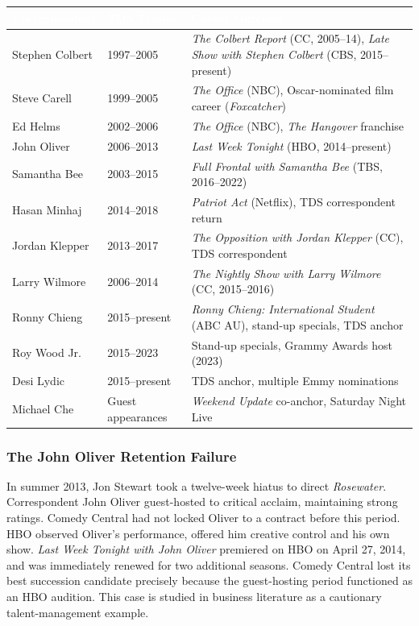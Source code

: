 \documentclass[11pt,letterpaper]{article}
\newcommand{\tableheader}[1]{\textbf{\sffamily\textcolor{white}{#1}}}
\begin{document}
\begin{center}
\begin{tabularx}{\textwidth}{L{3.5cm}L{3cm}X}
\toprule
{}
\tableheader{Correspondent} & \tableheader{TDS Tenure} & \tableheader{Career Outcome} \\
\midrule
Stephen Colbert & 1997--2005 & \textit{The Colbert Report} (CC, 2005--14), \textit{Late Show with Stephen Colbert} (CBS, 2015--present) \\
Steve Carell & 1999--2005 & \textit{The Office} (NBC), Oscar-nominated film career (\textit{Foxcatcher}) \\
Ed Helms & 2002--2006 & \textit{The Office} (NBC), \textit{The Hangover} franchise \\
John Oliver & 2006--2013 & \textit{Last Week Tonight} (HBO, 2014--present) \\
Samantha Bee & 2003--2015 & \textit{Full Frontal with Samantha Bee} (TBS, 2016--2022) \\
Hasan Minhaj & 2014--2018 & \textit{Patriot Act} (Netflix), TDS correspondent return \\
Jordan Klepper & 2013--2017 & \textit{The Opposition with Jordan Klepper} (CC), TDS correspondent \\
Larry Wilmore & 2006--2014 & \textit{The Nightly Show with Larry Wilmore} (CC, 2015--2016) \\
Ronny Chieng & 2015--present & \textit{Ronny Chieng: International Student} (ABC AU), stand-up specials, TDS anchor \\
Roy Wood Jr. & 2015--2023 & Stand-up specials, Grammy Awards host (2023) \\
Desi Lydic & 2015--present & TDS anchor, multiple Emmy nominations \\
Michael Che & Guest appearances & \textit{Weekend Update} co-anchor, Saturday Night Live \\
\bottomrule
\end{tabularx}
\end{center}

\subsubsection{The John Oliver Retention Failure}

In summer 2013, Jon Stewart took a twelve-week hiatus to direct \textit{Rosewater}. Correspondent John Oliver guest-hosted to critical acclaim, maintaining strong ratings. Comedy Central had not locked Oliver to a contract before this period. HBO observed Oliver's performance, offered him creative control and his own show. \textit{Last Week Tonight with John Oliver} premiered on HBO on April 27, 2014, and was immediately renewed for two additional seasons. Comedy Central lost its best succession candidate precisely because the guest-hosting period functioned as an HBO audition. This case is studied in business literature as a cautionary talent-management example.
\end{document}
